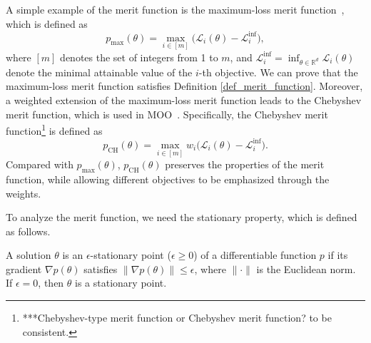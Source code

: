 \documentclass[sigconf]{acmart}
\begin{document}
A simple example of the merit function is the maximum-loss merit function~\cite{miettinen1999nonlinear}, which is defined as
\[
p_{\max}(\theta)
=
\max_{i\in[m]} \big( \mathcal{L}_i(\theta) - \mathcal{L}_i^{\inf} \big),
\]
where $[m]$ denotes the set of integers from 1 to $m$, and $\mathcal{L}_i^{\inf}= \inf_{\theta\in\mathbb{R}^d} \mathcal{L}_i(\theta)$ denote the minimal attainable value of the $i$-th objective. 
We can prove that the maximum-loss merit function satisfies Definition \ref{def_merit_function}. %
Moreover, a weighted extension of the maximum-loss merit function leads to the Chebyshev merit function, which is used in MOO~\cite{ehrgott2005multicriteria,lin2024smooth}. Specifically, the Chebyshev merit function\footnote{***Chebyshev-type merit function or Chebyshev merit function? to be consistent. } is defined as
\[
p_{\mathrm{CH}}(\theta)
=
\max_{i\in[m]} w_i \big( \mathcal{L}_i(\theta) - \mathcal{L}_i^{\inf} \big).
\]
Compared with $p_{\max}(\theta)$, $p_{\mathrm{CH}}(\theta)$ preserves the properties of the merit function, while allowing different objectives to be emphasized through the weights.


To analyze the merit function, we need the stationary property, which is defined as follows.

\begin{definition}
A solution $\theta$ is an $\epsilon$-stationary point ($\epsilon \ge 0$) of a differentiable function $p$ if its gradient $\nabla p(\theta)$ satisfies $\|\nabla p(\theta)\| \le \epsilon$, where $\|\cdot\|$ is the Euclidean norm. If $\epsilon = 0$, then $\theta$ is a stationary point.
\end{definition}


\end{document}
